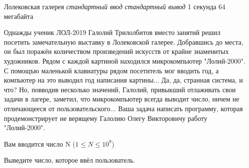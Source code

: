\begin{problem}%
{Лолековская галерея}%
{\textsl{стандартный ввод}}%
{\textsl{стандартный вывод}}%
{1 секунда}%
{64 мегабайта}{}

Однажды ученик ЛОЛ-2019 Галолий Трилолбитов вместо занятий решил посетить замечательную выставку в Лолековской галерее. Добравшись до места, он был поражён количеством произведений искусств от крайне знаменитых художников. Рядом с каждой картиной находился микрокомпьютер "Лолий-2000". С помощъю маленькой клавиатуры рядом посетитель мог вводить год, а компьютер на это выводил год написания картины... Да, да, странная система, и что? Но, повводив несколько значений, Галолий, привыкший отлаживать свои задачи в лагере, заметил, что микрокомпьютер всегда выводит число, ничем не отличающееся от пользовательского... Ваша задача написать программу, которая продемонстрирует не верящему Галолию Олегу Викторовичу работу "Лолий-2000".

\InputFile

Вам вводится число N ($1 \le N \le 10^9$)

\OutputFile

Выведите число, которое ввёл пользователь.

\Examples

\begin{example}
%
%
%
\end{example}
\end{problem}
